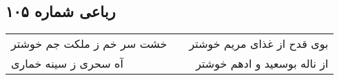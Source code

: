 \begin{center}
\section*{رباعی شماره ۱۰۵}
\label{sec:sh105}
\begin{longtable}{l p{0.5cm} r}
خشت سر خم ز ملکت جم خوشتر
&&
بوی قدح از غذای مریم خوشتر
\\
آه سحری ز سینه خماری
&&
از ناله بوسعید و ادهم خوشتر
\\
\end{longtable}
\end{center}
